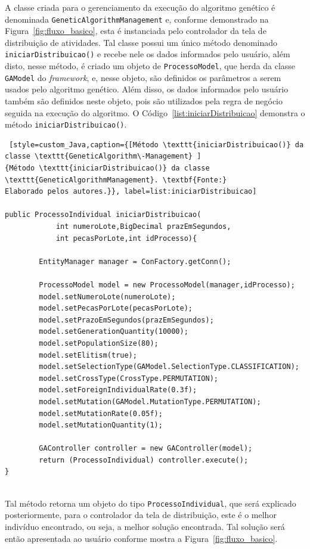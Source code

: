 \par A classe criada para o gerenciamento da execução do algoritmo genético é denominada \texttt{GeneticAlgorithmManagement} e, conforme demonstrado na Figura~\ref{fig:fluxo_basico}, esta é instanciada pelo controlador da tela de distribuição de atividades. Tal classe possui 
um único método denominado \texttt{iniciarDistribuicao()} e recebe nele os dados informados pelo usuário, além disto, nesse
método, é criado um objeto de \texttt{ProcessoModel}, que herda da classe \texttt{GAModel} do \textit{framework}, e, nesse objeto, são 
definidos os parâmetros a serem usados pelo algoritmo genético. Além disso, os dados informados pelo usuário também são definidos 
neste objeto, pois são utilizados pela regra de negócio seguida na execução do algoritmo. O Código~\ref{list:iniciarDistribuicao} 
demonstra o método \texttt{iniciarDistribuicao()}.


\begin{lstlisting} [style=custom_Java,caption={[Método \texttt{iniciarDistribuicao()} da classe \texttt{GeneticAlgorithm\-Management} ]
{Método \texttt{iniciarDistribuicao()} da classe \texttt{GeneticAlgorithmManagement}. \textbf{Fonte:}
Elaborado pelos autores.}}, label=list:iniciarDistribuicao]

public ProcessoIndividual iniciarDistribuicao(
			int numeroLote,BigDecimal prazEmSegundos,  
			int pecasPorLote,int idProcesso){

		EntityManager manager = ConFactory.getConn(); 
		
		ProcessoModel model = new ProcessoModel(manager,idProcesso);
		model.setNumeroLote(numeroLote);
		model.setPecasPorLote(pecasPorLote);
		model.setPrazoEmSegundos(prazEmSegundos);
		model.setGenerationQuantity(10000);
		model.setPopulationSize(80);
		model.setElitism(true);
		model.setSelectionType(GAModel.SelectionType.CLASSIFICATION);
		model.setCrossType(CrossType.PERMUTATION);
		model.setForeignIndividualRate(0.3f);
		model.setMutation(GAModel.MutationType.PERMUTATION);
		model.setMutationRate(0.05f);
		model.setMutationQuantity(1);

		GAController controller = new GAController(model);
		return (ProcessoIndividual) controller.execute();
}


\end{lstlisting}

\par Tal método retorna um objeto do tipo \texttt{ProcessoIndividual}, que será explicado posteriormente, para o controlador da tela de distribuição, este é o melhor indivíduo encontrado, ou seja, a melhor solução encontrada. Tal solução será então apresentada ao usuário conforme mostra a Figura~\ref{fig:fluxo_basico}.

